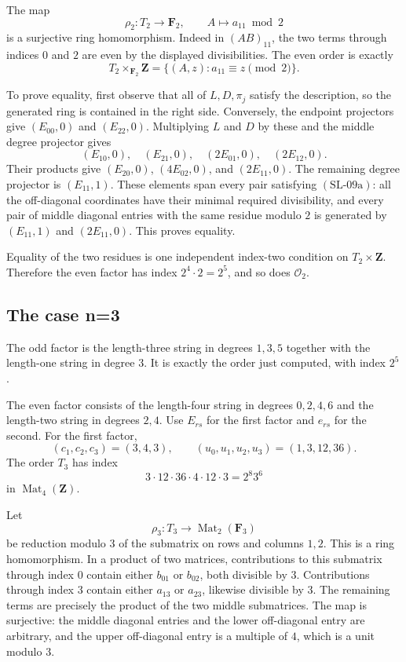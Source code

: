 \documentclass[11pt,a4paper]{article}
\theoremstyle{remark}
\begin{document}
The map
\[
\rho_2:T_2\longrightarrow\mathbf F_2,\qquad
A\longmapsto a_{11}\bmod2
\]
is a surjective ring homomorphism.  Indeed in
\((AB)_{11}\), the two terms through indices \(0\) and \(2\)
are even by the displayed divisibilities.  The even order is
exactly
\[
T_2\times_{\mathbf F_2}\mathbf Z
=\{(A,z):a_{11}\equiv z\pmod2\}.
\tag{SL-09a}
\]

To prove equality, first observe that all of \(L,D,\pi_j\)
satisfy the description, so the generated ring is contained in
the right side.  Conversely, the endpoint projectors give
\((E_{00},0)\) and \((E_{22},0)\).  Multiplying \(L\) and \(D\)
by these and the middle degree projector gives
\[
(E_{10},0),\quad(E_{21},0),\quad
(2E_{01},0),\quad(2E_{12},0).
\]
Their products give \((E_{20},0)\), \((4E_{02},0)\), and
\((2E_{11},0)\).  The remaining degree projector is
\((E_{11},1)\).  These elements span every pair satisfying
\((\mathrm{SL\text{-}09a})\): all the off-diagonal coordinates
have their minimal required divisibility, and every pair of
middle diagonal entries with the same residue modulo \(2\)
is generated by \((E_{11},1)\) and \((2E_{11},0)\).
This proves equality.

Equality of the two residues is one independent index-two
condition on \(T_2\times\mathbf Z\).  Therefore the even factor
has index \(2^4\cdot2=2^5\), and so does \(\mathcal O_2\).

\subsection{The case n=3}

The odd factor is the length-three string in degrees \(1,3,5\)
together with the length-one string in degree \(3\).  It is
exactly the order just computed, with index \(2^5\).

The even factor consists of the length-four string in degrees
\(0,2,4,6\) and the length-two string in degrees \(2,4\).
Use \(E_{rs}\) for the first factor and \(e_{rs}\) for the second.
For the first factor,
\[
(c_1,c_2,c_3)=(3,4,3),\qquad
(u_0,u_1,u_2,u_3)=(1,3,12,36).
\]
The order \(T_3\) has index
\[
3\cdot12\cdot36\cdot4\cdot12\cdot3
=2^8 3^6
\tag{SL-09b}
\]
in \(\operatorname{Mat}_4(\mathbf Z)\).

Let
\[
\rho_3:T_3\longrightarrow\operatorname{Mat}_2(\mathbf F_3)
\]
be reduction modulo \(3\) of the submatrix on rows and columns
\(1,2\).  This is a ring homomorphism.  In a product of two
matrices, contributions to this submatrix through index \(0\)
contain either \(b_{01}\) or \(b_{02}\), both divisible by \(3\).
Contributions through index \(3\) contain either \(a_{13}\) or
\(a_{23}\), likewise divisible by \(3\).  The remaining terms
are precisely the product of the two middle submatrices.
The map is surjective: the middle diagonal entries and the
lower off-diagonal entry are arbitrary, and the upper
off-diagonal entry is a multiple of \(4\), which is a unit
modulo \(3\).
\end{document}

